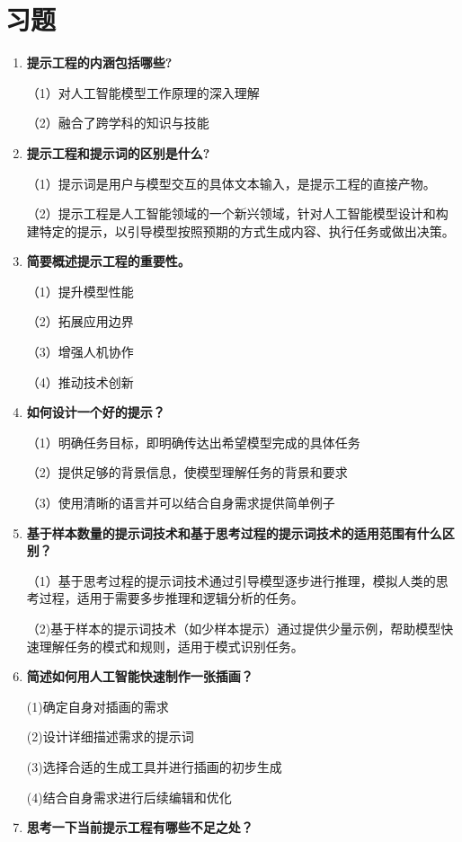 \section{习题}
\begin{enumerate}
\item \textbf{提示工程的内涵包括哪些?}

（1）对人工智能模型工作原理的深入理解

（2）融合了跨学科的知识与技能

\item \textbf{提示工程和提示词的区别是什么?}

（1）提示词是用户与模型交互的具体文本输入，是提示工程的直接产物。

（2）提示工程是人工智能领域的一个新兴领域，针对人工智能模型设计和构建特定的提示，以引导模型按照预期的方式生成内容、执行任务或做出决策。

\item \textbf{简要概述提示工程的重要性。}

（1）提升模型性能

（2）拓展应用边界

（3）增强人机协作

（4）推动技术创新

\item \textbf{如何设计一个好的提示？}

（1）明确任务目标，即明确传达出希望模型完成的具体任务

（2）提供足够的背景信息，使模型理解任务的背景和要求

（3）使用清晰的语言并可以结合自身需求提供简单例子

\item \textbf{基于样本数量的提示词技术和基于思考过程的提示词技术的适用范围有什么区别？}

（1）基于思考过程的提示词技术通过引导模型逐步进行推理，模拟人类的思考过程，适用于需要多步推理和逻辑分析的任务。

（2)基于样本的提示词技术（如少样本提示）通过提供少量示例，帮助模型快速理解任务的模式和规则，适用于模式识别任务。

\item \textbf{简述如何用人工智能快速制作一张插画？}

(1)确定自身对插画的需求

(2)设计详细描述需求的提示词

(3)选择合适的生成工具并进行插画的初步生成

(4)结合自身需求进行后续编辑和优化

\item \textbf{思考一下当前提示工程有哪些不足之处？}


\end{enumerate}
